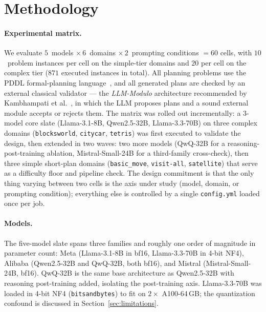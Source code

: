 
\section{Methodology}
\label{sec:methodology}

\paragraph{Experimental matrix.}
We evaluate $5$~models $\times\,6$~domains $\times\,2$~prompting conditions
$=60$ cells, with $10$~problem instances per cell on the simple-tier
domains and $20$ per cell on the complex tier ($871$ executed instances
in total). All planning problems use the PDDL formal-planning
language~\cite{pddl}, and all generated plans are checked by an
external classical validator --- the \emph{LLM-Modulo} architecture
recommended by Kambhampati et al.~\cite{kambhampati2024llmmodulo}, in
which the LLM proposes plans and a sound external module accepts or
rejects them. The matrix was rolled out incrementally: a 3-model core
slate (Llama-3.1-8B, Qwen2.5-32B, Llama-3.3-70B) on three complex domains
(\texttt{blocksworld}, \texttt{citycar}, \texttt{tetris}) was first
executed to validate the design, then extended in two waves: two more
models (QwQ-32B for a reasoning-post-training ablation, Mistral-Small-24B
for a third-family cross-check), then three simple short-plan domains
(\texttt{basic\_move}, \texttt{visit-all}, \texttt{satellite}) that
serve as a difficulty floor and pipeline check. The design commitment
is that the only thing varying between two cells is the axis under
study (model, domain, or prompting condition); everything else is
controlled by a single \texttt{config.yml} loaded once per job.

\paragraph{Models.}
The five-model slate spans three families and roughly one order of
magnitude in parameter count: Meta (Llama-3.1-8B in bf16,
Llama-3.3-70B in 4-bit NF4), Alibaba (Qwen2.5-32B and QwQ-32B, both
bf16), and Mistral (Mistral-Small-24B, bf16). QwQ-32B is the same base
architecture as Qwen2.5-32B with reasoning post-training added,
isolating the post-training axis. Llama-3.3-70B was loaded in 4-bit
NF4 (\texttt{bitsandbytes}) to fit on $2 \times$ A100-64\,GB; the
quantization confound is discussed in Section~\ref{sec:limitations}.

